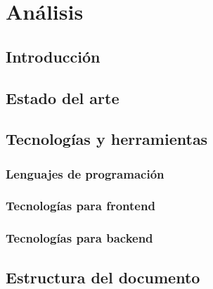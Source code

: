 \section{Análisis}

\subsection{Introducción}

\subsection{Estado del arte}
 

\subsection{Tecnologías y herramientas}

	\subsubsection{Lenguajes de programación}
	\subsubsection{Tecnologías para frontend}
	\subsubsection{Tecnologías para backend}

\subsection{Estructura del documento}

\newpage




